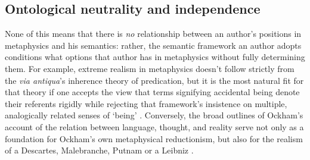 \documentclass[]{article}
\begin{document}
\subsection{Ontological neutrality and independence}
None of this means that there is \emph{no} relationship between an author's positions in metaphysics and his semantics: 
rather, 
the semantic framework an author adopts conditions what options that author has in metaphysics without fully determining them. 
For example, extreme realism in metaphysics doesn't follow strictly from the \emph{via antiqua}'s inherence theory of predication, 
but it is the most natural fit for that theory 
if one accepts the view that terms signifying accidental being denote their referents rigidly 
while rejecting that framework's insistence on multiple, analogically related senses of `being' \autocite[125]{Klima1999}. 
Conversely, the broad outlines of Ockham's account of the relation between language, thought, and reality 
serve not only as a foundation for Ockham's own metaphysical reductionism, 
but also for the realism of a Descartes, Malebranche, Putnam or a Leibniz \autocite{Klima1991}. 
\end{document}
